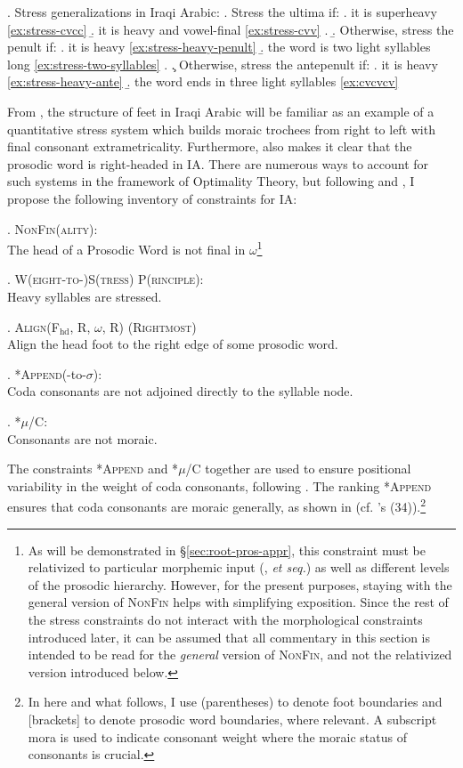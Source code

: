 \documentclass[12pt,twoside,letterpaper]{article}
\begin{document}
\ex. Stress generalizations in Iraqi Arabic:
\a. Stress the ultima if:
\a. it is superheavy \ref{ex:stress-cvcc}
\b. it is heavy and vowel-final \ref{ex:stress-cvv}
\z.
\b. Otherwise, stress the penult if:
\a. it is heavy \ref{ex:stress-heavy-penult}
\b. the word is two light syllables long \ref{ex:stress-two-syllables}
\z.
\c. Otherwise, stress the antepenult if:
\a. it is heavy \ref{ex:stress-heavy-ante}
\b. the word ends in three light syllables \ref{ex:cvcvcv}

From \Last, the structure of feet in Iraqi Arabic will be familiar as an example of a quantitative stress system which builds moraic trochees from right to left with final consonant extrametricality. Furthermore, \Last also makes it clear that the prosodic word is right-headed in IA. There are numerous ways to account for such systems in the framework of Optimality Theory, but following \cite{sherer94} and \cite{rosenthall99}, I propose the following inventory of constraints for IA:

\ex. \textsc{NonFin(ality)}:\\The head of a Prosodic Word is not final in $\omega$\footnote{As will be demonstrated in \S{\ref{sec:root-pros-appr}}, this constraint must be relativized to particular morphemic input (\cite{pater00}, \emph{et seq.}) as well as different levels of the prosodic hierarchy. However, for the present purposes, staying with the general version of \textsc{NonFin} helps with simplifying exposition. Since the rest of the stress constraints do not interact with the morphological constraints introduced later, it can be assumed that all commentary in this section is intended to be read for the \emph{general} version of \textsc{NonFin}, and not the relativized version introduced below.}

\ex. \textsc{W(eight-to-)S(tress) P(rinciple)}:\\Heavy syllables are stressed.

\ex. \textsc{Align}(F$_{\textrm{hd}}$, R, $\omega$, R) (\textsc{Rightmost)}\\Align the head foot to the right edge of some prosodic word.

\ex. *\textsc{Append}(-to-$\sigma$):\\Coda consonants are not adjoined directly to the syllable node.

\ex. *\textsc{$\mu$/C}:\\Consonants are not moraic.

The constraints *\textsc{Append} and *$\mu$/\textsc{C} together are used to ensure positional variability in the weight of coda consonants, following \cite{sherer94}. The ranking \textsc{*Append}  ensures that coda consonants are moraic generally, as shown in \Next (cf. \cite{rosenthall99}'s (34)).\footnote{In here and what follows, I use (parentheses) to denote foot boundaries and [brackets] to denote prosodic word boundaries, where relevant. A subscript mora is used to indicate consonant weight where the moraic status of consonants is crucial.}
\end{document}
